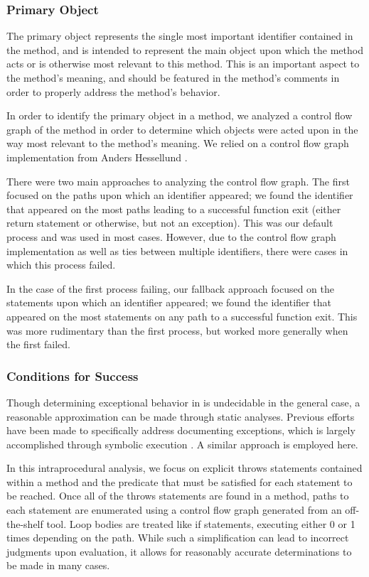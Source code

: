 \documentclass[preprint]{sigplanconf}
\begin{document}
\subsubsection{Primary Object}
The primary object represents the single most important identifier contained in the method, and is intended to represent the main object upon which the method acts or is otherwise most relevant to this method. This is an important aspect to the method's meaning, and should be featured in the method's comments in order to properly address the method's behavior.

In order to identify the primary object in a method, we analyzed a control flow graph of the method in order to determine which objects were acted upon in the way most relevant to the method's meaning. We relied on a control flow graph implementation from Anders Hessellund \cite{hessellund}.

There were two main approaches to analyzing the control flow graph. The first focused on the paths upon which an identifier appeared; we found the identifier that appeared on the most paths leading to a successful function exit (either return statement or otherwise, but not an exception). This was our default process and was used in most cases. However, due to the control flow graph implementation as well as ties between multiple identifiers, there were cases in which this process failed.

In the case of the first process failing, our fallback approach focused on the statements upon which an identifier appeared; we found the identifier that appeared on the most statements on any path to a successful function exit. This was more rudimentary than the first process, but worked more generally when the first failed.

\subsubsection{Conditions for Success}
Though determining exceptional behavior in is undecidable in the general case, a reasonable approximation can be made through static analyses. Previous efforts have been made to specifically address documenting exceptions, which is largely accomplished through symbolic execution \cite{buse08}. A similar approach is employed here.

In this intraprocedural analysis, we focus on explicit throws statements contained within a method and the predicate that must be satisfied for each statement to be reached. Once all of the throws statements are found in a method, paths to each statement are enumerated using a control flow graph generated from an off-the-shelf tool. Loop bodies are treated like if statements, executing either 0 or 1 times depending on the path. While such a simplification can lead to incorrect judgments upon evaluation, it allows for reasonably accurate determinations to be made in many cases.
\end{document}
